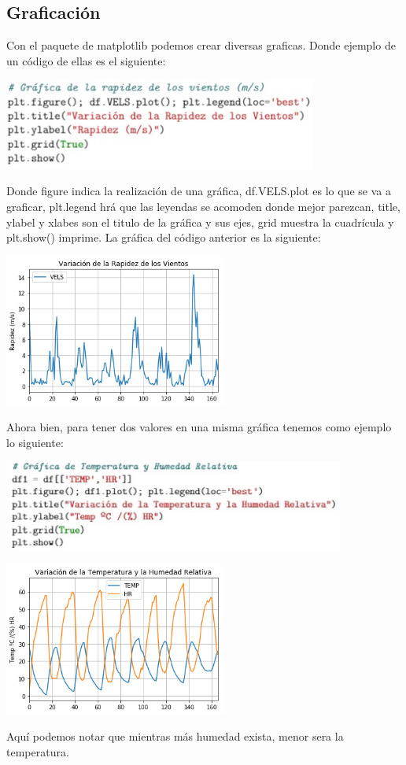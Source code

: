 \documentclass[12pt]{article}
\begin{document}
\subsection{Graficación}
Con el paquete de matplotlib podemos crear diversas graficas. Donde ejemplo de un código de ellas es el siguiente:
\begin{center}
	\includegraphics[height=3cm]{rap.jpg}
\end{center}
Donde figure indica la realización de una gráfica, df.VELS.plot es lo que se va a graficar, plt.legend hrá que las leyendas se acomoden donde mejor parezcan, title, ylabel y xlabes son el titulo de la gráfica y sus ejes, grid muestra la cuadrícula y plt.show() imprime. La gráfica del código anterior es la siguiente:
\begin{center}
	\includegraphics[height=5cm]{output_11_0.png}
\end{center}
Ahora bien, para tener dos valores en una misma gráfica tenemos como ejemplo lo siguiente:
\begin{center}
	\includegraphics[height=3cm]{th.jpg}
\end{center}
\begin{center}
	\includegraphics[height=5cm]{output_12_1.png}
\end{center}
Aquí podemos notar que mientras más humedad exista, menor sera la temperatura.\\
\end{document}
